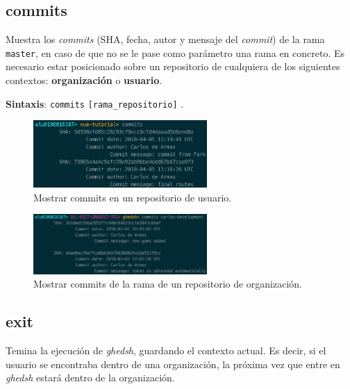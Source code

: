 \subsection{commits}
\label{3.3.3}

Muestra los {\it commits} (SHA, fecha, autor y mensaje del {\it commit}) de la rama \verb|master|, en caso de que no se le pase como parámetro una rama en concreto.
Es necesario estar posicionado sobre un repositorio de cualquiera de los siguientes contextos: \textbf{organización} o \textbf{usuario}.

\textbf{Sintaxis}: \verb|commits| \verb|[rama_repositorio]| .

\begin{figure}[H]
	\begin{center}
	\includegraphics[width=0.59\textwidth]{images/user-commits.png}
	\caption{Mostrar commits en un repositorio de usuario.}
	\label{fig:user-commits}
	\end{center}
\end{figure}

\begin{figure}[H]
	\begin{center}
	\includegraphics[width=0.59\textwidth]{images/orgs-commits.png}
	\caption{Mostrar commits de la rama de un repositorio de organización.}
	\label{fig:user-commits}
	\end{center}
\end{figure}

\subsection{exit}
\label{3.3.4}

Temina la ejecución de {\it ghedsh}, guardando el contexto actual. Es decir, si el usuario se encontraba dentro de una organización, la próxima vez que entre en {\it ghedsh} estará dentro de la organización.

